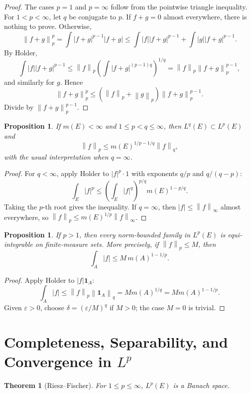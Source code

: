 \documentclass[11pt,openany]{book}
\numberwithin{equation}{chapter}
\theoremstyle{definition}
\theoremstyle{plain}
\newtheorem{theorem}[definition]{Theorem}
\newtheorem{proposition}[definition]{Proposition}
\theoremstyle{remark}
\newcommand{\eps}{\varepsilon}
\newcommand{\1}{\mathbf{1}}
\newcommand{\abs}[1]{\left\lvert #1\right\rvert}
\newcommand{\norm}[1]{\left\lVert #1\right\rVert}
\begin{document}
\begin{proof}
The cases \(p=1\) and \(p=\infty\) follow from the pointwise triangle inequality.  For \(1<p<\infty\), let \(q\) be conjugate to \(p\).  If \(f+g=0\) almost everywhere, there is nothing to prove.  Otherwise,
\[
    \norm{f+g}_p^p=\int\abs{f+g}^{p-1}\abs{f+g}
    \le\int\abs f\abs{f+g}^{p-1}+\int\abs g\abs{f+g}^{p-1}.
\]
By Holder,
\[
    \int\abs f\abs{f+g}^{p-1}
    \le\norm f_p\left(\int\abs{f+g}^{(p-1)q}\right)^{1/q}
    =\norm f_p\norm{f+g}_p^{p-1},
\]
and similarly for \(g\).  Hence
\[
    \norm{f+g}_p^p\le(\norm f_p+\norm g_p)\norm{f+g}_p^{p-1}.
\]
Divide by \(\norm{f+g}_p^{p-1}\).
\end{proof}

\begin{proposition}
If \(m(E)<\infty\) and \(1\le p<q\le\infty\), then \(L^q(E)\subset L^p(E)\) and
\[
    \norm f_p\le m(E)^{1/p-1/q}\norm f_q,
\]
with the usual interpretation when \(q=\infty\).
\end{proposition}

\begin{proof}
For \(q<\infty\), apply Holder to \(\abs f^p\cdot 1\) with exponents \(q/p\) and \(q/(q-p)\):
\[
    \int_E\abs f^p
    \le \left(\int_E\abs f^q\right)^{p/q}m(E)^{1-p/q}.
\]
Taking the \(p\)-th root gives the inequality.  If \(q=\infty\), then \(\abs f\le\norm f_\infty\) almost everywhere, so \(\norm f_p\le m(E)^{1/p}\norm f_\infty\).
\end{proof}

\begin{proposition}
If \(p>1\), then every norm-bounded family in \(L^p(E)\) is equi-integrable on finite-measure sets.  More precisely, if \(\norm f_p\le M\), then
\[
    \int_A\abs f\le M\,m(A)^{1-1/p}.
\]
\end{proposition}

\begin{proof}
Apply Holder to \(\abs f\1_A\):
\[
    \int_A\abs f\le \norm f_p\norm{\1_A}_q=M m(A)^{1/q}=M m(A)^{1-1/p}.
\]
Given \(\eps>0\), choose \(\delta=(\eps/M)^q\) if \(M>0\); the case \(M=0\) is trivial.
\end{proof}

\section{Completeness, Separability, and Convergence in \texorpdfstring{$L^p$}{Lp}}

\begin{theorem}[Riesz--Fischer]
For \(1\le p\le\infty\), \(L^p(E)\) is a Banach space.
\end{theorem}
\end{document}
